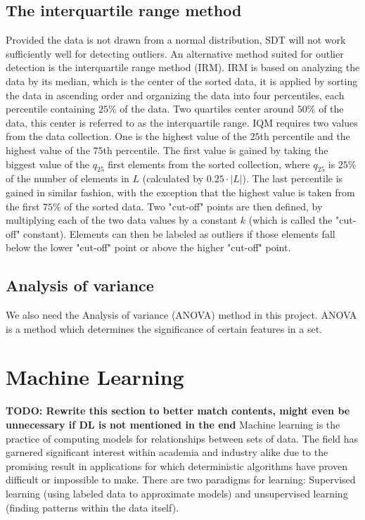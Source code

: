 \subsection{The interquartile range method}
Provided the data is not drawn from a normal distribution, SDT will not work sufficiently well for detecting outliers.  An alternative method suited for outlier detection is the interquartile range method (IRM). IRM is based on analyzing the data by its median, which is the center of the sorted data, it is applied by sorting the data in ascending order and organizing the data into four percentiles, each percentile containing $25\%$ of the data.  Two quartiles center around $50\%$ of the data, this center is referred to as the interquartile range. IQM requires two values from the data collection. One is the highest value of the $25$th percentile and the highest value of the $75$th percentile. The first value is gained by taking the biggest value of the $q_25$ first elements from the sorted collection, where $q_25$ is $25\%$ of the number of elements in $L$ (calculated by $0.25 \cdot |L|$). The last percentile is gained in similar fashion, with the exception that the highest value is taken from the first $75\%$ of the sorted data. Two "cut-off" points are then defined, by multiplying each of the two data values by a constant $k$ (which is called the "cut-off" constant). Elements can then be labeled as outliers if those elements fall below the lower "cut-off" point or above the higher "cut-off" point.

\subsection{Analysis of variance}

We also need the Analysis of variance (ANOVA) method in this project. ANOVA is a method which determines the significance of certain features in a set.

\section{Machine Learning}

\textbf{TODO: Rewrite this section to better match contents, might even be unnecessary if DL is not mentioned in the end}
Machine learning is the practice of computing models for relationships between sets of data. The field has garnered significant interest within academia and industry alike due to the promising result in applications for which deterministic algorithms have proven difficult or impossible to make. There are two paradigms for learning: Supervised learning (using labeled data to approximate models) and unsupervised learning (finding patterns within the data itself). 

